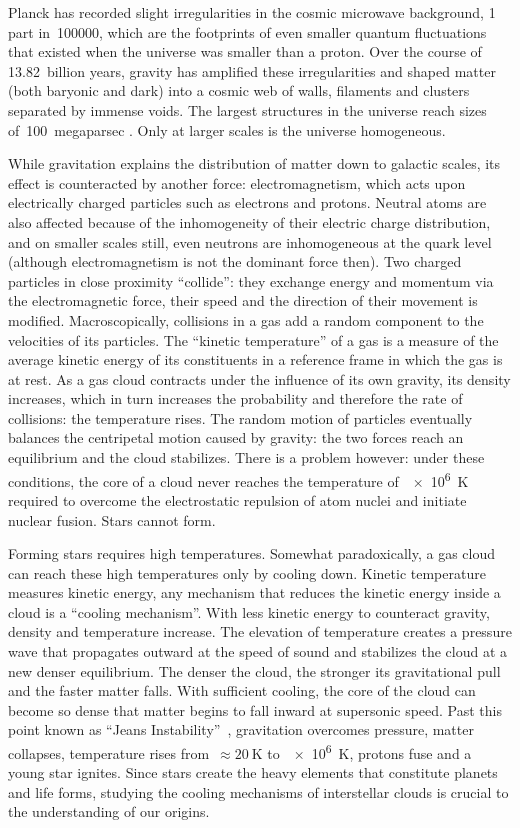 Planck has recorded slight irregularities in the cosmic microwave background, 1 part in~\num{100000}, which are the footprints of even smaller quantum fluctuations that existed when the universe was smaller than a proton.
Over the course of 13.82~billion years, gravity has amplified these irregularities and shaped matter (both baryonic and dark) into a cosmic web of walls, filaments and clusters separated by immense voids.
The largest structures in the universe reach sizes of~\SI{100}{megaparsec} \autocite{scrimgeour2012wigglez}.
Only at larger scales is the universe homogeneous.

While gravitation explains the distribution of matter down to galactic scales, its effect is counteracted by another force: electromagnetism, which acts upon electrically charged particles such as electrons and protons.
Neutral atoms are also affected because of the inhomogeneity of their electric charge distribution, and on smaller scales still, even neutrons are inhomogeneous at the quark level (although electromagnetism is not the dominant force then).
Two charged particles in close proximity ``collide'': they exchange energy and momentum via the electromagnetic force, their speed and the direction of their movement is modified.
Macroscopically, collisions in a gas add a random component to the velocities of its particles.
The ``kinetic temperature'' of a gas is a measure of the average kinetic energy of its constituents in a reference frame in which the gas is at rest.
As a gas cloud contracts under the influence of its own gravity, its density increases, which in turn increases the probability and therefore the rate of collisions: the temperature rises.
The random motion of particles eventually balances the centripetal motion caused by gravity: the two forces reach an equilibrium and the cloud stabilizes.
There is a problem however: under these conditions, the core of a cloud never reaches the temperature of~\SI{e6}{\kelvin} required to overcome the electrostatic repulsion of atom nuclei and initiate nuclear fusion.
Stars cannot form.

Forming stars requires high temperatures.
Somewhat paradoxically, a gas cloud can reach these high temperatures only by cooling down.
Kinetic temperature measures kinetic energy,
any mechanism that reduces the kinetic energy inside a cloud is a ``cooling mechanism''.
With less kinetic energy to counteract gravity, density and temperature increase.
The elevation of temperature creates a pressure wave that propagates outward at the speed of sound and stabilizes the cloud at a new denser equilibrium.
The denser the cloud, the stronger its gravitational pull and the faster matter falls.
With sufficient cooling, the core of the cloud can become so dense that matter begins to fall inward at supersonic speed.
Past this point known as ``Jeans Instability''~\autocite{jeans1902stability}, gravitation overcomes pressure,
matter collapses, temperature rises from~$\approx\SI{20}{\kelvin}$ to~\SI{e6}{\kelvin}, protons fuse and a young star ignites.
Since stars create the heavy elements that constitute planets and life forms, studying the cooling mechanisms of interstellar clouds is crucial to the understanding of our origins.

